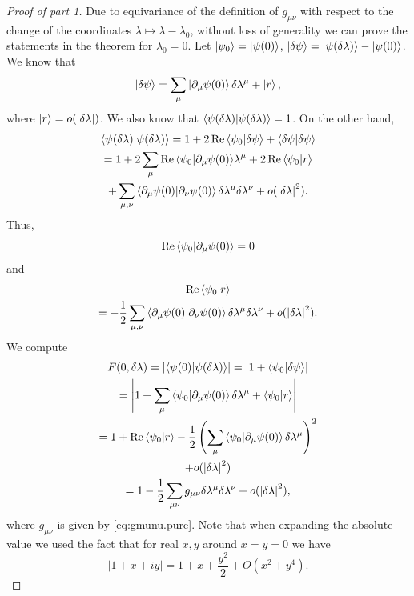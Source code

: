 \documentclass[
  american,aps,pra,reprint,floatfix,nofootinbib,superscriptaddress
]{revtex4-2}
\DeclareMathOperator{\real}{Re}
\newcommand{\abs}[1]{\left|#1\right|}
\begin{document}
\begin{proof}[Proof of part 1]
  Due to equivariance of the definition of $g_{\mu\nu}$ with respect to
  the change of the coordinates $\lambda \mapsto \lambda - \lambda_0$,
  without loss of generality we can prove the statements in the theorem for
  $\lambda_0 = 0$. Let $\ket{\psi_0} = \ket{\psi(0)}$,
  $\ket{\delta \psi} = \ket{\psi(\delta\lambda)} - \ket{\psi(0)}$.
  We know that
  \begin{equation}
    \ket{\delta \psi} = \sum_{\mu} \ket{\partial_\mu\psi(0)} \delta\lambda^\mu
      + \ket{r},
  \end{equation}
  where $\ket{r} = o(\abs{\delta\lambda})$.
  We also know that $\braket{\psi(\delta\lambda)|\psi(\delta\lambda)} = 1$.
  On the other hand,
  \begin{multline}
    \braket{\psi(\delta\lambda)|\psi(\delta\lambda)} =
    1 + 2\real{\braket{\psi_0|\delta\psi}} + \braket{\delta\psi|\delta\psi}\\
    = 1 + 2\sum_\mu\real{\braket{\psi_0|\partial_\mu\psi(0)}}\lambda^\mu
      + 2\real{\braket{\psi_0|r}}\\
      + \sum_{\mu,\nu}\braket{\partial_\mu\psi(0)|\partial_\nu\psi(0)}
        \delta\lambda^\mu \delta\lambda^\nu
      + o(\abs{\delta\lambda}^2).
  \end{multline}
  Thus,
  \begin{equation}
    \real{\braket{\psi_0|\partial_\mu\psi(0)}} = 0
  \end{equation}
  and
  \begin{multline}
    \real{\braket{\psi_0|r}} \\
      = - \frac12 \sum_{\mu,\nu}
        \braket{\partial_\mu\psi(0)|\partial_\nu\psi(0)}
        \delta\lambda^\mu \delta\lambda^\nu
    + o(\abs{\delta\lambda}^2).
  \end{multline}
  We compute
  \begin{multline}
    F(0, \delta\lambda) = \abs{\braket{\psi(0)|\psi(\delta\lambda)}}
    = \abs{1 + \braket{\psi_0|\delta \psi}} \\
    = \abs{1 + \sum_\mu\braket{\psi_0|\partial_\mu \psi(0)}\delta\lambda^\mu
      + \braket{\psi_0|r}} \\
    = 1 + \real{\braket{\psi_0|r}} - \frac12 \left(
      \sum_\mu\braket{\psi_0|\partial_\mu \psi(0)}\delta\lambda^\mu\right)^2\\
      + o(\abs{\delta\lambda}^2) \\
    = 1 - \frac12 \sum_{\mu\nu} g_{\mu\nu} \delta \lambda^\mu \delta \lambda^\nu
      + o(\abs{\delta \lambda}^2),
  \end{multline}
  where $g_{\mu\nu}$ is given by \eqref{eq:gmunu.pure}.
  Note that when expanding the absolute value we used
  the fact that for real $x,y$ around $x=y=0$ we have
  \begin{equation}
    \abs{1 + x + iy} = 1 + x + \frac{y^2}{2} + O(x^2 + y^4).
  \end{equation}
\end{proof}
\end{document}
